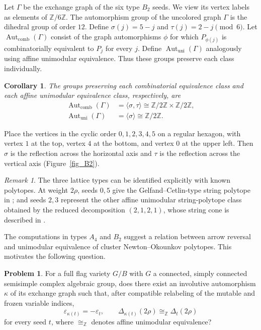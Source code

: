 \documentclass[10pt]{amsart}
\numberwithin{equation}{section}
\theoremstyle{plain}
\newtheorem{corollary}[theorem]{Corollary}
\theoremstyle{definition}
\newtheorem{Problem}[theorem]{Problem}
\theoremstyle{remark}
\newtheorem{remark}[theorem]{Remark}
\begin{document}
Let $\Gamma$ be the exchange graph of the six type $B_2$
seeds.
We view its vertex labels as elements of
$\mathbb Z/6\mathbb Z$.
The automorphism group of the uncolored graph $\Gamma$ is
the dihedral group of order $12$. 
Define $\sigma(j)=5-j$ and $\tau(j)=2-j\pmod 6$. 
Let $\operatorname{Aut}_{\mathrm{comb}}(\Gamma)$
consist of the graph automorphisms $\phi$ for which
$P_{\phi(j)}$ is combinatorially equivalent to $P_j$
for every $j$.
Define $\operatorname{Aut}_{\mathrm{uni}}(\Gamma)$
analogously using affine unimodular equivalence.
Thus these groups preserve each class individually.
\begin{corollary}\label{cor_B2_symmetry}
	The groups preserving each combinatorial equivalence
	class and each affine unimodular equivalence class,
	respectively, are
\begin{align*}
	\operatorname{Aut}_{\mathrm{comb}}(\Gamma)
	&=\langle\sigma,\tau\rangle
	\cong\mathbb Z/2\mathbb Z\times\mathbb Z/2\mathbb Z,\\
	\operatorname{Aut}_{\mathrm{uni}}(\Gamma)
	&=\langle\sigma\rangle\cong\mathbb Z/2\mathbb Z.
\end{align*}
\end{corollary}

Place the vertices in the cyclic order $0,1,2,3,4,5$ on a
regular hexagon, with vertex $1$ at the top, vertex $4$ at
the bottom, and vertex $0$ at the upper left.
Then $\sigma$ is the reflection across the horizontal axis and
$\tau$ is the reflection across the vertical axis (Figure~\ref{fig_B2}).


\begin{remark}\label{rem_B2_literature}
	The three lattice types can be identified explicitly with
	known polytopes. At weight $2\rho$, seeds $0,5$ give the
	Gelfand--Cetlin-type string polytope in
	\cite[Example~6.33]{FujitaOya}; 
	and seeds $2,3$ represent the other affine unimodular
	string-polytope class obtained by the reduced decomposition $(2,1,2,1)$, whose string cone is described
	in \cite[Lemma~5.17]{CFL_BC}.
\end{remark}

The computations in types \(A_4\) and \(B_2\) suggest a relation between arrow reversal and unimodular equivalence of cluster Newton--Okounkov polytopes. This motivates the following question.
\begin{Problem}\label{Prob_equivalence}
For a full flag variety $G/B$ with $G$ a connected, simply connected
semisimple complex algebraic group, does there exist an involutive
automorphism $\kappa$ of its exchange graph such that, after
compatible relabeling of the mutable and frozen variable indices,
	\[
	\varepsilon_{\kappa(t)}=-\varepsilon_t,
	\qquad
	\Delta_{\kappa(t)}(2\rho)\cong_{\mathbb Z}\Delta_t(2\rho)
	\]
	for every seed \(t\), where \(\cong_{\mathbb Z}\) denotes affine unimodular equivalence?
\end{Problem}
\end{document}
